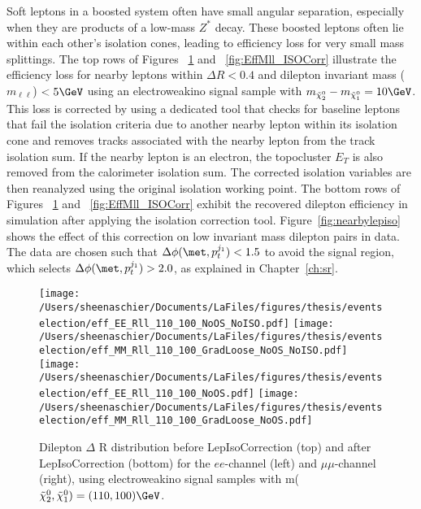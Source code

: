  Soft leptons in a boosted system often have small angular separation, especially when they are products of a low-mass $Z^*$ decay.  These boosted leptons often lie within each other's isolation cones, leading to efficiency loss for very small mass splittings.  The top rows of Figures~ \ref{fig:EffRll_ISOCorr} and ~\ref{fig:EffMll_ISOCorr} illustrate the efficiency loss for nearby leptons within $\Delta R < 0.4$ and dilepton invariant mass ($m_{\ell\ell}$) $<5\GeV$ using an electroweakino signal sample with $m_{\tilde\chi_2^0}-m_{\tilde\chi_1^0}=10\GeV$.  This loss is corrected by using a dedicated tool that checks for baseline leptons that fail the isolation criteria due to another nearby lepton within its isolation cone and removes tracks associated with the nearby lepton from the track isolation sum.  If the nearby lepton is an electron, the topocluster $E_T$ is also removed from the calorimeter isolation sum.  The corrected isolation variables are then reanalyzed using the original isolation working point.  The bottom rows of Figures~ \ref{fig:EffRll_ISOCorr} and ~\ref{fig:EffMll_ISOCorr} exhibit the recovered dilepton efficiency in simulation after applying the isolation correction tool.  Figure~\ref{fig:nearbylepiso} shows the effect of this correction on low invariant mass dilepton pairs in data.  The data are chosen such that $\Delta\phi(\met, p_{t}^{j_1})<1.5$ to avoid the signal region, which selects $\Delta\phi(\met, p_{t}^{j_1})>2.0$, as explained in Chapter~\ref{ch:sr}.   
  \begin{figure}[tbp]
     \texttt{[image: /Users/sheenaschier/Documents/LaFiles/figures/thesis/eventselection/eff\_EE\_Rll\_110\_100\_NoOS\_NoISO.pdf]}
       \texttt{[image: /Users/sheenaschier/Documents/LaFiles/figures/thesis/eventselection/eff\_MM\_Rll\_110\_100\_GradLoose\_NoOS\_NoISO.pdf]}\\
     \texttt{[image: /Users/sheenaschier/Documents/LaFiles/figures/thesis/eventselection/eff\_EE\_Rll\_110\_100\_NoOS.pdf]}
     \texttt{[image: /Users/sheenaschier/Documents/LaFiles/figures/thesis/eventselection/eff\_MM\_Rll\_110\_100\_GradLoose\_NoOS.pdf]}\\
   \caption{Dilepton $\Delta$ R distribution before LepIsoCorrection (top) and after LepIsoCorrection (bottom) for the $ee$-channel (left) and $\mu\mu$-channel (right), using electroweakino signal samples with m($\tilde\chi_2^0,\tilde\chi_1^0)=(110, 100)\GeV$.}
   \label{fig:EffRll_ISOCorr}
 \end{figure}

